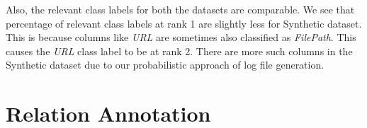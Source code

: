 Also, the relevant class labels for both the datasets are comparable. We see that percentage of relevant class labels at rank 1 are slightly less for Synthetic dataset. This is because columns like \textit{URL} are sometimes also classified as \textit{FilePath}. This causes the \textit{URL} class label to be at rank 2. There are more such columns in the Synthetic dataset due to our probabilistic approach of log file generation.


\section{Relation Annotation}
